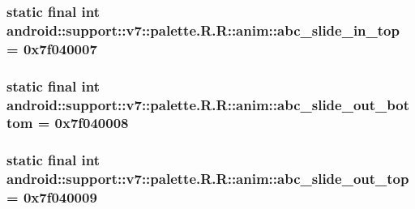 \hypertarget{classandroid_1_1support_1_1v7_1_1palette_1_1_r_1_1anim_bfab90de7887a49ea2c701f2dca08a23}{
\subsubsection[{abc\_\-slide\_\-in\_\-top}]{\setlength{\rightskip}{0pt plus 5cm}static final int android::support::v7::palette.R.R::anim::abc\_\-slide\_\-in\_\-top = 0x7f040007}}
\label{classandroid_1_1support_1_1v7_1_1palette_1_1_r_1_1anim_bfab90de7887a49ea2c701f2dca08a23}


\hypertarget{classandroid_1_1support_1_1v7_1_1palette_1_1_r_1_1anim_7d075caf97b46400de1f9e6fa806f5c7}{
\subsubsection[{abc\_\-slide\_\-out\_\-bottom}]{\setlength{\rightskip}{0pt plus 5cm}static final int android::support::v7::palette.R.R::anim::abc\_\-slide\_\-out\_\-bottom = 0x7f040008}}
\label{classandroid_1_1support_1_1v7_1_1palette_1_1_r_1_1anim_7d075caf97b46400de1f9e6fa806f5c7}


\hypertarget{classandroid_1_1support_1_1v7_1_1palette_1_1_r_1_1anim_063aa7473782e4ecbc272fd83429fcfe}{
\subsubsection[{abc\_\-slide\_\-out\_\-top}]{\setlength{\rightskip}{0pt plus 5cm}static final int android::support::v7::palette.R.R::anim::abc\_\-slide\_\-out\_\-top = 0x7f040009}}
\label{classandroid_1_1support_1_1v7_1_1palette_1_1_r_1_1anim_063aa7473782e4ecbc272fd83429fcfe}


